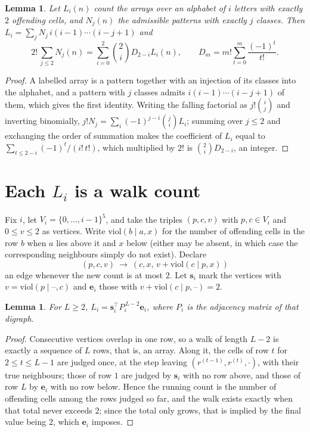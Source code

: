 \documentclass[11pt,a4paper]{article}
\theoremstyle{plain}
\newtheorem{lemma}[theorem]{Lemma}
\theoremstyle{definition}
\begin{document}
\begin{lemma}\label{lem:inv}
Let $L_i(n)$ count the arrays over an alphabet of $i$ letters with exactly $2$ offending
cells, and $N_j(n)$ the admissible patterns with exactly $j$ classes. Then
$L_i=\sum_j N_j\,i(i-1)\cdots(i-j+1)$ and
\[
2!\,\sum_{j\le2}N_j(n)=\sum_{i=0}^{2}\binom{2}{i}D_{2-i}L_i(n),
\qquad D_m=m!\sum_{t=0}^{m}\frac{(-1)^t}{t!} .
\]
\end{lemma}

\begin{proof}
A labelled array is a pattern together with an injection of its classes into the alphabet,
and a pattern with $j$ classes admits $i(i-1)\cdots(i-j+1)$ of them, which gives the first
identity. Writing the falling factorial as $j!\binom{i}{j}$ and inverting binomially,
$j!N_j=\sum_i(-1)^{j-i}\binom{j}{i}L_i$; summing over $j\le2$ and exchanging the
order of summation makes the coefficient of $L_i$ equal to
$\sum_{t\le2-i}(-1)^t/(i!\,t!)$, which multiplied by $2!$ is
$\binom{2}{i}D_{2-i}$, an integer.
\end{proof}

\section{Each $L_i$ is a walk count}

Fix $i$, let $V_i=\{0,\dots,i-1\}^{5}$, and take the triples $(p,c,v)$ with
$p,c\in V_i$ and $0\le v\le2$ as vertices. Write $\mathrm{viol}(b\mid a,x)$ for the number
of offending cells in the row $b$ when $a$ lies above it and $x$ below (either may be
absent, in which case the corresponding neighbours simply do not exist). Declare
\[
(p,c,v)\ \longrightarrow\ (c,x,\,v+\mathrm{viol}(c\mid p,x))
\]
an edge whenever the new count is at most $2$. Let $\mathbf{s}_i$ mark the vertices with
$v=\mathrm{viol}(p\mid\text{--},c)$ and $\mathbf{e}_i$ those with
$v+\mathrm{viol}(c\mid p,\text{--})=2$.

\begin{lemma}\label{lem:walk}
For $L\ge2$, $L_i=\mathbf{s}_i^{\!\top}P_i^{\,L-2}\mathbf{e}_i$, where $P_i$ is the
adjacency matrix of that digraph.
\end{lemma}

\begin{proof}
Consecutive vertices overlap in one row, so a walk of length $L-2$ is exactly a sequence
of $L$ rows, that is, an array. Along it, the cells of row $t$ for $2\le t\le L-1$ are
judged once, at the step leaving $(r^{(t-1)},r^{(t)},\cdot)$, with their true neighbours;
those of row $1$ are judged by $\mathbf{s}_i$ with no row above, and those of row
$L$ by $\mathbf{e}_i$ with no row below. Hence the running count is the number of
offending cells among the rows judged so far, and the walk exists exactly when that total
never exceeds $2$; since the total only grows, that is implied by the final value being
$2$, which $\mathbf{e}_i$ imposes.
\end{proof}
\end{document}
